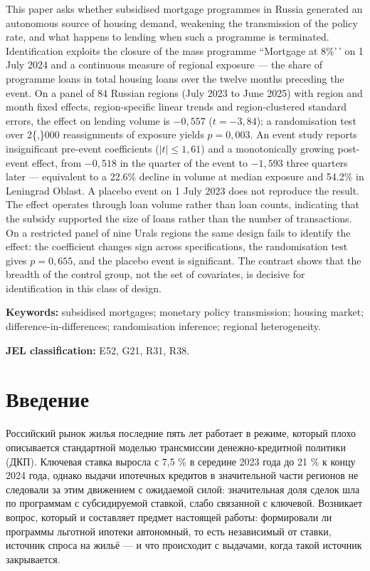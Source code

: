 \documentclass[
  russian,
  11pt,
]{article}
\begin{document}
This paper asks whether subsidised mortgage programmes in Russia
generated an autonomous source of housing demand, weakening the
transmission of the policy rate, and what happens to lending when such a
programme is terminated. Identification exploits the closure of the mass
programme ``Mortgage at 8\%'\,' on 1 July 2024 and a continuous measure
of regional exposure --- the share of programme loans in total housing
loans over the twelve months preceding the event. On a panel of 84
Russian regions (July 2023 to June 2025) with region and month fixed
effects, region-specific linear trends and region-clustered standard
errors, the effect on lending volume is \(-0{,}557\) (\(t = -3{,}84\));
a randomisation test over 2\{,\}000 reassignments of exposure yields
\(p = 0{,}003\). An event study reports insignificant pre-event
coefficients (\(|t| \le 1{,}61\)) and a monotonically growing post-event
effect, from \(-0{,}518\) in the quarter of the event to \(-1{,}593\)
three quarters later --- equivalent to a 22.6\% decline in volume at
median exposure and 54.2\% in Leningrad Oblast. A placebo event on 1
July 2023 does not reproduce the result. The effect operates through
loan volume rather than loan counts, indicating that the subsidy
supported the size of loans rather than the number of transactions. On a
restricted panel of nine Urals regions the same design fails to identify
the effect: the coefficient changes sign across specifications, the
randomisation test gives \(p = 0{,}655\), and the placebo event is
significant. The contrast shows that the breadth of the control group,
not the set of covariates, is decisive for identification in this class
of design.

\textbf{Keywords:} subsidised mortgages; monetary policy transmission;
housing market; difference-in-differences; randomisation inference;
regional heterogeneity.

\textbf{JEL classification:} E52, G21, R31, R38.

\section{Введение}\label{ux432ux432ux435ux434ux435ux43dux438ux435}

Российский рынок жилья последние пять лет работает в режиме, который
плохо описывается стандартной моделью трансмиссии денежно-кредитной
политики (ДКП). Ключевая ставка выросла с 7,5 \% в середине 2023 года до
21 \% к концу 2024 года, однако выдачи ипотечных кредитов в значительной
части регионов не следовали за этим движением с ожидаемой силой:
значительная доля сделок шла по программам с субсидируемой ставкой,
слабо связанной с ключевой. Возникает вопрос, который и составляет
предмет настоящей работы: формировали ли программы льготной ипотеки
автономный, то есть независимый от ставки, источник спроса на жильё ---
и что происходит с выдачами, когда такой источник закрывается.
\end{document}
